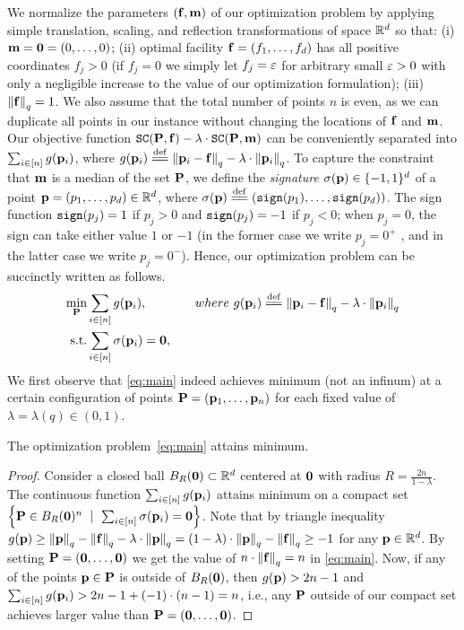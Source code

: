 We normalize the parameters $(\facility,\median)$ of our optimization problem by applying simple translation, scaling, and reflection transformations of space $\reals^d$ so that: (i) $\median=\vect{0}=(0,\ldots,0)$; (ii) optimal facility $\facility=(f_1,\ldots,f_d)$ has all positive coordinates $f_j> 0$ (if $f_j=0$ we simply let $f_j=\eps$ for arbitrary small $\eps>0$ with only a negligible increase to the value of our optimization formulation); (iii) $\qnorm{\facility}=1$. We also assume that the total number of points $n$ is even, as we can duplicate all points in our instance without changing the locations of $\facility$ and $\median$. 
Our objective function $\SC(\locs,\facility)-\lambda\cdot\SC(\locs,\median)$ can be conveniently separated into $\sum_{i\in[n]}g(\loci)$, where $
g(\loci)\eqdef \qnorm{\loci-\facility}-\lambda\cdot\qnorm{\loci}$. To capture the constraint that $\median$ is a median of the set $\locs$, we define the \emph{signature} $\sigma(\loc)\in\{-1,1\}^d$ of a point $\loc=(p_1,\ldots,p_d)\in\reals^d$, where $\sigma(\loc)\eqdef(\sign(p_1),\ldots,\sign(p_d))$.    
The sign function $\sign(p_{j})=1$ if $p_{j}>0$ and $\sign(p_{j})=-1$ if $p_{j}<0$; when $p_{j}=0$, the sign can take either value $1$ or $-1$ (in the former case we write $p_{j}=0^+$ , and in the latter case we write $p_{j}=0^-$). Hence, our optimization problem can be succinctly written as follows.
\begin{align}
 \label{eq:main}
 \min\limits_{\locs}& \sum_{i\in[n]} g(\loci), &\quad %
 where~ g(\loci)\eqdef\qnorm{\loci-\facility}-\lambda\cdot\qnorm{\loci} \nonumber\\
 \text{s.t.}&  \sum_{i\in [n]}\sigma(\loci) = \vect{0}, & 
\end{align}
We first observe that \eqref{eq:main} indeed achieves minimum (not an infinum) at a certain configuration of points $\locs=(\loci[1],\ldots,\loci[n])$ for each fixed value of $\lambda=\lambda(q)\in(0,1)$.
\begin{claim}
    \label{cl:compact set}
    The optimization problem~\eqref{eq:main} attains minimum.
\end{claim}
\begin{proof}
Consider a closed ball $B_R(\zerovec)\subset{\R^d}$ centered at $\zerovec$ with radius $R=\frac{2n}{1-\lambda}$. The continuous function $\sum_{i\in[n]}g(\loci)$ attains minimum on a compact set $\left\{\locs\in B_R(\zerovec)^n ~\mid~\sum_{i\in[n]}\sigma(\loci)=\vect{0}\right\}$.
Note that by triangle inequality $g(\loc)\ge\qnorm{\loc}-
\qnorm{\facility}-\lambda\cdot\qnorm{\loc}=(1-
\lambda)\cdot\qnorm{\loc}-\qnorm{\facility}\ge -1$ for any 
$\loc\in\reals^d$. By setting $\locs=
(\vect{0},\ldots,\vect{0})$ we get the value of 
$n\cdot\qnorm{\facility}=n$ in \eqref{eq:main}. Now, if any of the points $\loc\in\locs$ is outside of $B_R(\zerovec)$, then $g(\loc)> 2n-1$ and $\sum_{i\in[n]}g(\loci)> 2n-1 + (-1)\cdot (n-1)=n$, i.e., any $\locs$ outside of our compact set achieves larger value than $\locs=(\zerovec,\ldots,\zerovec)$. 
\end{proof}

